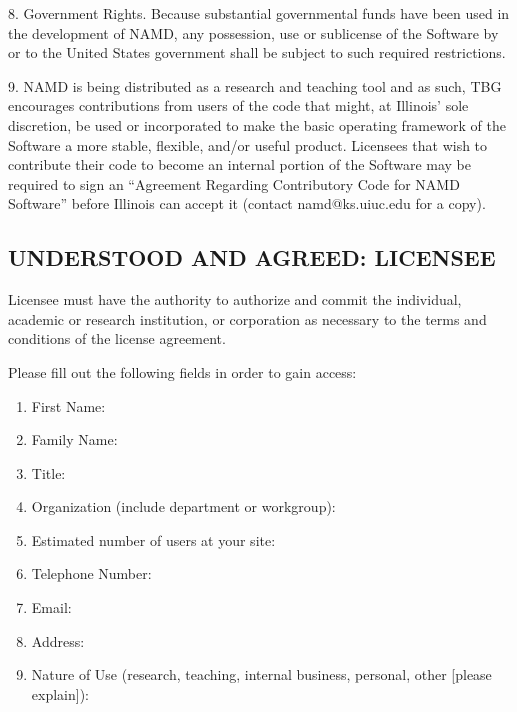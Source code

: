 8. Government Rights. Because substantial governmental funds have been 
used in the development of NAMD, any possession, use or sublicense of 
the Software by or to the United States government shall be subject 
to such required restrictions.

9. NAMD is being distributed as a research and teaching tool and as such, 
TBG encourages contributions from users of the code that might, at 
Illinois' sole discretion, be used or incorporated to make the basic 
operating framework of the Software a more stable, flexible, and/or 
useful product. Licensees that wish to contribute their code to become 
an internal portion of the Software may be required to sign an 
``Agreement Regarding Contributory Code for NAMD Software''
before Illinois can accept it (contact namd@ks.uiuc.edu for a copy).

\newpage
\subsection*{UNDERSTOOD AND AGREED: LICENSEE}

Licensee must have the authority to authorize and commit the individual,
academic or research institution, or corporation as necessary to the 
terms and conditions of the license agreement.

Please fill out the following fields in order to gain access:

\begin{enumerate}
\item First Name:

\item Family Name:

\item Title:

\item Organization (include department or workgroup):

\item Estimated number of users at your site:

\item Telephone Number:

\item Email:

\item Address:

\vskip 0.5in

\item Nature of Use (research, teaching, internal business, personal, other
[please explain]):

\vskip 1in

\end{enumerate}



